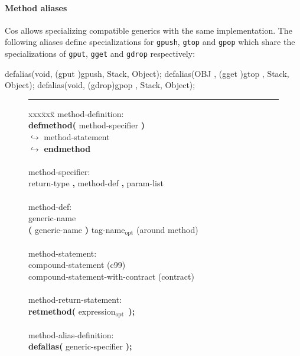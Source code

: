 \documentclass[preprint,10pt]{sigplanconf}
\newcommand{\ProgLang}[1]{{\sc #1}\xspace}
\newcommand{\Cos}       {\ProgLang{Cos}}
\newcommand{\ttb}[1]{{\normalfont\ttfamily\bfseries #1}}
\newcommand{\opt}{\ensuremath{_{\text{opt}}}\xspace}
\newcommand{\lnk}{\ensuremath{\hookrightarrow}\xspace}
\newcommand{\hr}{\rule{\columnwidth}{0.33pt}}
\newcommand{\code}[1]{\lstinline[language=COS,style=samplecode]|#1|}
\begin{document}
\paragraph{Method aliases}

\Cos allows specializing compatible generics with the same implementation. The following aliases define specializations for \code{gpush}, \code{gtop} and \code{gpop} which share the specializations of \code{gput}, \code{gget} and \code{gdrop} respectively:
\begin{COS}
defalias(void, (gput )gpush, Stack, Object);
defalias(OBJ , (gget )gtop , Stack, Object);
defalias(void, (gdrop)gpop , Stack, Object);
\end{COS}

\begin{figure}\hr
\begin{center}
{\em\vspace{-1mm}
\begin{tabbing}
xxx\= xxx\= \hspace*{14.5em}\= \hspace*{2.6em}\= \hspace*{1.9em}\= \kill
method-definition: \\
\> \ttb{defmethod(} method-specifier \ttb{)} \\ \lnk
\> \> method-statement \\ \lnk
\> \ttb{endmethod} \\
\\
method-specifier: \\
\> return-type \ttb{,} method-def \ttb{,} param-list \\
\\
method-def: \\
\> generic-name \\
\> \ttb{(} generic-name \ttb{)} tag-name\opt 	\>\> (around method) \\
\\
method-statement: \\
\> compound-statement 						\>\>\>\> (c99) \\
\> compound-statement-with-contract 			\>\>\> (contract) \\
\\
method-return-statement: \\
\> \ttb{retmethod(} expression\opt\ \ttb{);}\\
\\
method-alias-definition: \\
\> \ttb{defalias(} generic-specifier \ttb{);} \\

\end{tabbing}}
\end{center}
\end{figure}
\end{document}
